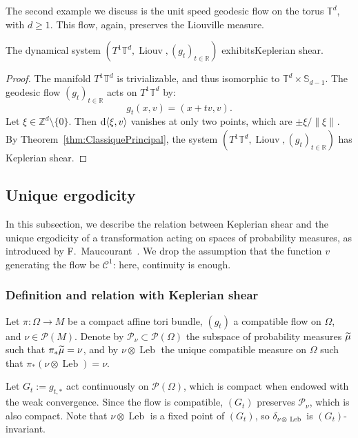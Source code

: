 \documentclass[10pt]{amsart}
\theoremstyle{definition}\newtheorem{defi}[theo]{Definition}\newtheorem{rema}[theo]{Remark}\newtheorem{exam}[theo]{Example}\newtheorem{exem}[theo]{Example}\newtheorem{nota}[theo]{Notation}
\DeclareMathOperator{\Leb}{Leb}
\DeclareMathOperator{\Liouv}{Liouv}
\newcommand{\Z}{\mathbb{Z}}
\newcommand{\R}{\mathbb{R}}
\newcommand{\Sbb}{\mathbb{S}}
\newcommand{\Tbb}{\mathbb{T}}
\newcommand{\Ccal}{\mathcal{C}}
\newcommand{\Pcal}{\mathcal{P}}
\newcommand{\de}{{\rm d}}
\newcommand{\norm}[2]{\left\| #1 \right\|_{#2}}
\let\oldtilde\tilde
\renewcommand*{\tilde}[1]{\mathchoice{\widetilde{#1}}{\widetilde{#1}}{\oldtilde{#1}}{\oldtilde{#1}}}\let\oldhat\hat
\renewcommand*{\hat}[1]{\mathchoice{\widehat{#1}}{\widehat{#1}}{\oldhat{#1}}{\oldhat{#1}}}\let\oldforall\forall
\renewcommand*{\forall}{\mathrel{\oldforall}}
\begin{document}
The second example we discuss is the unit speed geodesic flow on the torus $\Tbb^d$, with $d \geq 1$. This flow, again, preserves the Liouville measure.

\begin{prop}\label{prop:FlotToreCisaillement}
The dynamical system $(T^1 \Tbb^d, \Liouv, (g_t)_{t \in \R})$ exhibits\linebreak Keplerian shear.
\end{prop}


\begin{proof}%
The manifold $T^1 \Tbb^d$ is trivializable, and thus isomorphic to $\Tbb^d\times \Sbb_{d-1}$. The geodesic flow $(g_t)_{t \in \R}$ acts on $T^1 \Tbb^d$ by:
\[
g_t (x,v) = (x+tv, v).
\]
Let $\xi \in \Z^d \setminus \{0\}$. Then $\de \langle \xi, v \rangle$ vanishes at only two points, which are $\pm \xi / \norm{\xi}{}$. By Theorem~\ref{thm:ClassiquePrincipal}, the system $(T^1 \Tbb^d, \Liouv, (g_t)_{t \in \R})$ has Keplerian shear.
\end{proof}


\subsection{Unique ergodicity}\label{subsec:UniqueErgodicite}

In this subsection, we describe the relation between Keplerian shear and the unique ergodicity of a transformation acting on spaces of probability measures, as introduced by F.~Maucourant~\cite{Maucourant:2016}. We drop the assumption that the function $v$ generating the flow be $\Ccal^1$: here, continuity is enough.

\subsubsection{Definition and relation with Keplerian shear}

Let $\pi : \Omega \to M$ be a compact affine tori bundle, $(g_t)$ a compatible flow on $\Omega$, and $\nu \in \Pcal (M)$. Denote by $\Pcal_\nu \subset \Pcal (\Omega)$ the subspace of probability measures $\tilde{\mu}$ such that $\pi_* \tilde{\mu} = \nu$, and by $\nu \otimes \Leb$ the unique compatible measure on $\Omega$ such that $\pi_* (\nu \otimes \Leb) = \nu$.


Let $G_t := g_{t,*}$ act continuously on $\Pcal (\Omega)$, which is compact when endowed with the weak convergence. Since the flow is compatible, $(G_t)$ preserves $\Pcal_\nu$, which is also compact. Note that $\nu \otimes \Leb$ is a fixed point of $(G_t)$, so $\delta_{\nu \otimes \Leb}$ is $(G_t)$-invariant.
\end{document}
